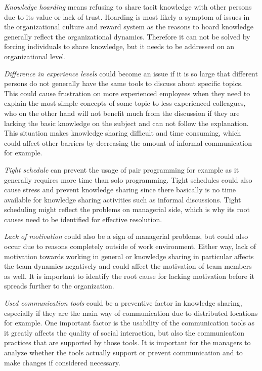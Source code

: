 \emph{Knowledge hoarding} means refusing to share tacit knowledge with other persons due to its value or lack of trust. Hoarding is most likely a symptom of issues in 
the organizational culture and reward system as the reasons to hoard knowledge generally reflect the organizational dynamics. Therefore it can not be solved by forcing
individuals to share knowledge, but it needs to be addressed on an organizational level. \citep{Dalkir2013}

\emph{Difference in experience levels} could become an issue if it is so large that different persons do not generally have the same tools to discuss about specific
topics. This could cause frustration on more experienced employees when they need to explain the most simple concepts of some topic to less experienced colleagues, who on the
other hand will not benefit much from the discussion if they are lacking the basic knowledge on the subject and can not follow the explanation. This situation makes
knowledge sharing difficult and time consuming, which could affect other barriers by decreasing the amount of informal communication for example. \citep{Ghobadi2016}

\emph{Tight schedule} can prevent the usage of pair programming for example as it generally requires more time than solo programming. Tight schedules could also cause stress
and prevent knowledge sharing since there basically is no time available for knowledge sharing activities such as informal discussions. Tight scheduling might reflect
the problems on managerial side, which is why its root causes need to be identified for effective resolution. \citep{Ghobadi2016}

\emph{Lack of motivation} could also be a sign of managerial problems, but could also occur due to reasons completely outside of work environment. Either way, lack of
motivation towards working in general or knowledge sharing in particular affects the team dynamics negatively and could affect the motivation of team members as well.
It is important to identify the root cause for lacking motivation before it spreads further to the organization. \citep{Ghobadi2016}

\emph{Used communication tools} could be a preventive factor in knowledge sharing, especially if they are the main way of communication due to distributed locations for
example. One important factor is the usability of the communication tools as it greatly affects the quality of social interaction, but also the communication practices that 
are supported by those tools. It is important for the managers to analyze whether the tools actually support or prevent communication and to make changes if
considered necessary. \citep{Ghobadi2016}

